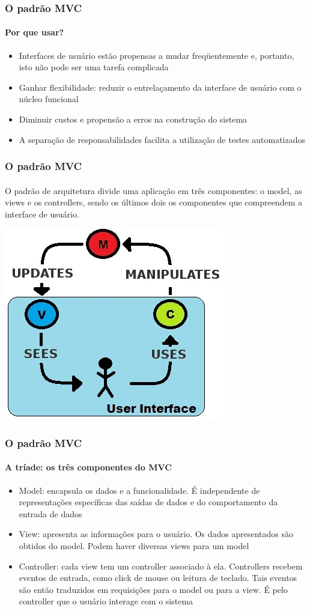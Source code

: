 \documentclass{beamer}
\begin{document}
\begin{frame}
\frametitle{O padrão MVC}
\framesubtitle{Por que usar?}
\begin{itemize}
	\item Interfaces de usuário estão propensas a mudar freqüentemente e, portanto, isto não pode ser uma tarefa complicada
	\item Ganhar flexibilidade: reduzir o entrelaçamento da interface de usuário com o núcleo funcional
	\item Diminuir custos e propensão a erros na construção do sistema
	\item A separação de responsabilidades facilita a utilização de testes automatizados
\end{itemize}
\end{frame}

\begin{frame}
\frametitle{O padrão MVC}
\framesubtitle{}
	O padrão de arquitetura divide uma aplicação em três componentes: o model, as views e os controllers, sendo os últimos dois os componentes que compreendem a interface de usuário.
\begin{center}
	\includegraphics[scale=0.4]{MVC.jpg}
\end{center}
\end{frame}

\begin{frame}
\frametitle{O padrão MVC}
\framesubtitle{A tríade: os três componentes do MVC}
\begin{itemize}
	\item Model: encapsula os dados e a funcionalidade. É independente de representações específicas das saídas de dados e do comportamento da entrada de dados
	\item View: apresenta as informações para o usuário. Os dados apresentados são obtidos do model. Podem haver diversas views para um model
	\item Controller: cada view tem um controller associado à ela. Controllers recebem eventos de entrada, como click de mouse ou leitura de teclado. Tais eventos são então traduzidos em requisições para o model ou para a view. É pelo controller que o usuário interage com o sistema
\end{itemize}
\end{frame}
\end{document}
